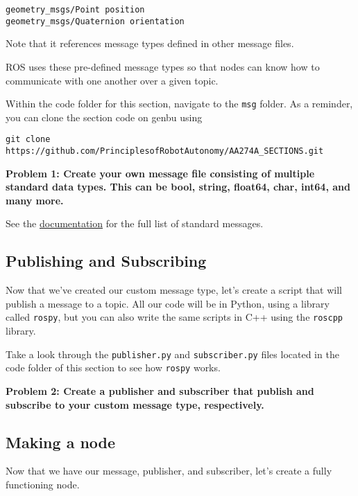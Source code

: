 \begin{lstlisting}
geometry_msgs/Point position
geometry_msgs/Quaternion orientation
\end{lstlisting}

Note that it references message types defined in other message files.

ROS uses these pre-defined message types so that nodes can know how to communicate with one another over a given topic.

Within the code folder for this section, navigate to the \texttt{msg} folder. As a reminder, you can clone the section code on genbu using 

\begin{lstlisting}
git clone https://github.com/PrinciplesofRobotAutonomy/AA274A_SECTIONS.git
\end{lstlisting}

\textbf{Problem 1: Create your own message file consisting of multiple standard data types. This can be bool, string, float64, char, int64, and many more.}

See the \href{http://docs.ros.org/kinetic/api/std_msgs/html/index-msg.html}{documentation} for the full list of standard messages.


\subsection{Publishing and Subscribing}
Now that we've created our custom message type, let's create a script that will publish a message to a topic. All our code will be in Python, using a library called \texttt{rospy}, but you can also write the same scripts in C++ using the \texttt{roscpp} library. 

Take a look through the \texttt{publisher.py} and \texttt{subscriber.py} files located in the code folder of this section to see how \texttt{rospy} works. 

\textbf{Problem 2: Create a publisher and subscriber that publish and subscribe to your custom message type, respectively.}


\subsection{Making a node}
Now that we have our message, publisher, and subscriber, let's create a fully functioning node.

